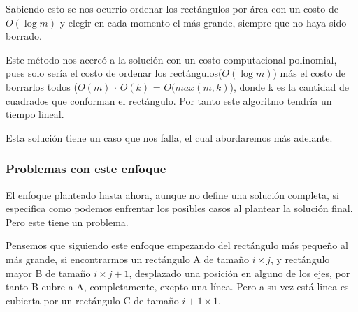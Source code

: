 \documentclass{article}
\begin{document}
Sabiendo esto se nos ocurrio ordenar los rectángulos por área con un costo de $O(\log m)$ y elegir en cada momento el más grande, siempre que no haya sido borrado.


Este método nos acercó a la solución con un costo computacional polinomial, pues solo sería el costo de ordenar los rectángulos($O(\log m)$) más el costo de borrarlos todos ($O(m)$ $\cdot$ $O(k)$ = $O(max (m, k)$), donde k es la cantidad de cuadrados que conforman el rectángulo. Por tanto este algoritmo tendría un tiempo lineal.

Esta solución tiene un caso que nos falla, el cual abordaremos más adelante.
	\subsubsection{Problemas con este enfoque}
	
	El enfoque planteado hasta ahora, aunque no define una solución completa, si especifica como podemos enfrentar los posibles casos al plantear la solución final. Pero este tiene un problema.

Pensemos que siguiendo este enfoque empezando del rectángulo más pequeño al más grande, si encontrarmos un rectángulo A de tamaño $i \times j$, y rectángulo mayor B de tamaño $i \times j + 1$, desplazado una posición en alguno de los ejes, por tanto B cubre a A, completamente, exepto una línea. Pero a su vez está linea es cubierta por un rectángulo C de tamaño $i + 1 \times 1$.  \\

\begin{center}


\end{center}
\end{document}
